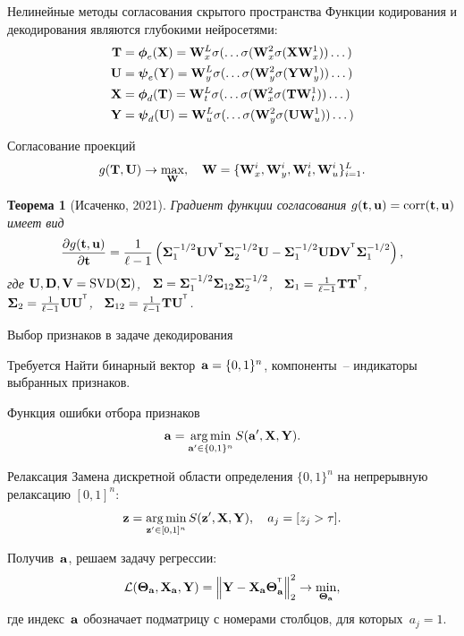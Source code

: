\documentclass[10pt]{beamer}
\newtheorem{rustheorem}{Теорема}
\begin{document}
\begin{frame}{Нелинейные методы согласования скрытого пространства}
	Функции кодирования и декодирования являются глубокими нейросетями:
	\vspace{-0.1cm}
	\begin{align*}
		\mathbf{T} &= \boldsymbol{\phi}_e(\mathbf{X}) =  \mathbf{W}_x^L \sigma(\dots \sigma(\mathbf{W}_x^2 \sigma(\mathbf{X} \mathbf{W}_x^1)) \dots ) \\
		\mathbf{U} &= \boldsymbol{\psi}_e(\mathbf{Y}) =  \mathbf{W}_y^L \sigma(\dots \sigma(\mathbf{W}_y^2 \sigma(\mathbf{Y} \mathbf{W}_y^1)) \dots ) \\
		\mathbf{X} &= \boldsymbol{\phi}_d(\mathbf{T}) =  \mathbf{W}_t^L \sigma(\dots \sigma(\mathbf{W}_x^2 \sigma(\mathbf{T} \mathbf{W}_t^1)) \dots ) \\
		\mathbf{Y} &= \boldsymbol{\psi}_d(\mathbf{U}) =  \mathbf{W}_u^L \sigma(\dots \sigma(\mathbf{W}_y^2 \sigma(\mathbf{U} \mathbf{W}_u^1)) \dots )
	\end{align*}
	\vspace{-0.4cm}
	\begin{block}{Согласование проекций}
		\vspace{-0.3cm}
		\[
			g(\mathbf{T}, \mathbf{U}) \rightarrow \max_{\mathbf{W}}, \quad \mathbf{W} = \{\mathbf{W}_x^i, \mathbf{W}_y^i, \mathbf{W}_t^i, \mathbf{W}_u^i\}_{i=1}^L.
		\]
	\end{block}	
	\vspace{-0.3cm}
	\begin{rustheorem}[Исаченко, 2021]
		Градиент функции согласования $g(\mathbf{t}, \mathbf{u}) = \textnormal{corr}(\mathbf{t}, \mathbf{u})$ имеет вид
		\[
			\frac{\partial g(\mathbf{t}, \mathbf{u})}{\partial \mathbf{t}} = \frac{1}{\ell - 1} \left(\boldsymbol{\Sigma}_1^{-1/2} \mathbf{U} \mathbf{V}^{^{\text{\tiny\sffamily\upshape\mdseries T}}} \boldsymbol{\Sigma}_2^{-1/2} \mathbf{U} - \boldsymbol{\Sigma}_1^{-1/2} \mathbf{U} \mathbf{D} \mathbf{V}^{^{\text{\tiny\sffamily\upshape\mdseries T}}} \boldsymbol{\Sigma}_1^{-1/2} \right),
		\]
		где $\mathbf{U}, \mathbf{D}, \mathbf{V} = \textnormal{SVD}(\boldsymbol{\Sigma})$, \, $\boldsymbol{\Sigma} = \boldsymbol{\Sigma}_1^{-1/2} \boldsymbol{\Sigma}_{12} \boldsymbol{\Sigma}_2^{-1/2} $, \, $\boldsymbol{\Sigma}_1 = \frac{1}{\ell - 1} \mathbf{T} \mathbf{T}^{^{\text{\tiny\sffamily\upshape\mdseries T}}}$, \, $\boldsymbol{\Sigma}_2 = \frac{1}{\ell - 1} \mathbf{U} \mathbf{U}^{^{\text{\tiny\sffamily\upshape\mdseries T}}}$, \, $\boldsymbol{\Sigma}_{12} = \frac{1}{\ell - 1} \mathbf{T} \mathbf{U}^{^{\text{\tiny\sffamily\upshape\mdseries T}}}$.
	\end{rustheorem}
\end{frame}
\begin{frame}{Выбор признаков в задаче декодирования}
	\begin{block}{Требуется}
	Найти бинарный вектор~$\mathbf{a} = \{0, 1\}^n$, компоненты~-- индикаторы выбранных признаков. 
	\end{block}
	\begin{block}{Функция ошибки отбора признаков}
		\vspace{-0.2cm}
	\[
	\mathbf{a} = \mathop{\arg \min}\limits_{\mathbf{a}' \in \{0, 1\}^n} S(\mathbf{a}', \mathbf{X}, \mathbf{Y}).
	\]
	\vspace{-0.5cm}
	\end{block}
	\begin{block}{Релаксация}
		Замена дискретной области определения $\{0, 1\}^n$ на непрерывную релаксацию $[0, 1]^n$:
		\[
		\mathbf{z} = \mathop{\arg \min}\limits_{\mathbf{z}' \in [0, 1]^n} S(\mathbf{z}', \mathbf{X}, \mathbf{Y}), \quad 
		a_j = [z_j > \tau].
	\]
	\end{block}
	Получив~$\mathbf{a}$, решаем задачу регрессии:
	\[
	\mathcal{L}(\boldsymbol{\Theta}_{\mathbf{a}}, \mathbf{X}_{\mathbf{a}}, \mathbf{Y}) = {\left\| \mathbf{Y} - \mathbf{X}_{\mathbf{a}}\boldsymbol{\Theta}^{^{\text{\tiny\sffamily\upshape\mdseries T}}}_{\mathbf{a}} \right\| }_2^2 \rightarrow\min_{\boldsymbol{\Theta}_{\mathbf{a}}},
	\]
	где индекс~$\mathbf{a}$ обозначает подматрицу с номерами столбцов, для которых~$a_j = 1$.
\end{frame}
\end{document}
